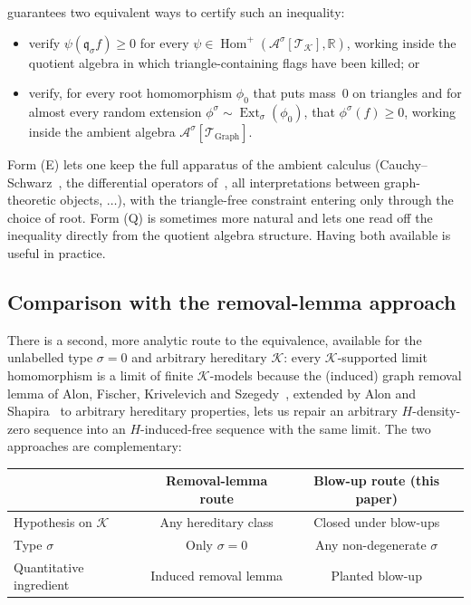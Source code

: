 \documentclass[11pt]{article}
\theoremstyle{definition}
\newcommand{\R}{\mathbb{R}}
\newcommand{\A}{\mathcal{A}}
\newcommand{\K}{\mathcal{K}}
\newcommand{\T}{\mathcal{T}}
\newcommand{\Homp}{\operatorname{Hom}^{+}}
\newcommand{\Ext}{\operatorname{Ext}}
\newcommand{\q}{\mathfrak{q}}
\begin{document}
 guarantees two equivalent ways to certify such an
inequality:
\begin{itemize}[leftmargin=2em]
\item[(Q)]
verify $\psi(\q_\sigma f)\ge 0$ for every
$\psi\in\Homp(\A^\sigma[\T_\K],\R)$, working inside the quotient
algebra in which triangle-containing flags have been killed; or
\item[(E)]
verify, for every root homomorphism $\phi_0$ that puts mass~$0$ on
triangles and for almost every random extension
$\phi^\sigma\sim\Ext_\sigma(\phi_0)$, that $\phi^\sigma(f)\ge 0$,
working inside the ambient algebra
$\A^\sigma[\T_{\mathrm{Graph}}]$.
\end{itemize}
Form (E) lets one keep the full apparatus of the ambient calculus
(Cauchy--Schwarz~\cite[Theorem~3.14]{Razborov2007}, the differential
operators of~\cite[\S4.3]{Razborov2007}, all interpretations between
graph-theoretic objects, $\ldots$), with the triangle-free constraint
entering only through the choice of root.  Form (Q) is sometimes more
natural and lets one read off the inequality directly from the
quotient algebra structure.  Having both available is useful in
practice.

\subsection{Comparison with the removal-lemma approach}

There is a second, more analytic route to the equivalence, available
for the unlabelled type $\sigma=0$ and arbitrary hereditary $\K$:
every $\K$-supported limit homomorphism is a limit of finite $\K$-models
because the (induced) graph removal lemma of Alon, Fischer,
Krivelevich and Szegedy~\cite{AFKS2000}, extended by Alon and
Shapira~\cite{AlonShapira2008} to arbitrary hereditary properties,
lets us repair an arbitrary $H$-density-zero sequence into an
$H$-induced-free sequence with the same limit.  The two approaches are
complementary:

\begin{center}
\begin{tabular}{lcc}
\toprule
   & Removal-lemma route & Blow-up route (this paper)\\
\midrule
Hypothesis on $\K$           & Any hereditary class & Closed under blow-ups\\
Type $\sigma$                & Only $\sigma=0$       & Any non-degenerate $\sigma$\\
Quantitative ingredient      & Induced removal lemma & Planted blow-up\\
\bottomrule
\end{tabular}
\end{center}
\end{document}
